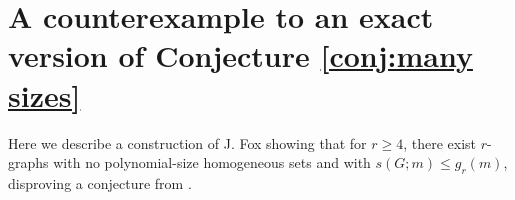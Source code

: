 \documentclass[11pt]{article}
\theoremstyle{plain}
\begin{document}







\appendix

\section{A counterexample to an exact version of Conjecture \ref{conj:many sizes}}
Here we describe a construction of J. Fox showing that for $r \geq 4$, there exist $r$-graphs with no polynomial-size homogeneous sets and with $s(G;m) \leq g_r(m)$, disproving a conjecture from \cite{ABGMW}. 
	
\end{document}
